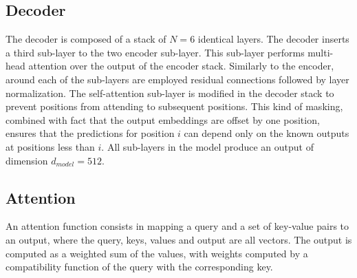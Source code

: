 \documentclass[\main/main.tex]{subfiles}
\begin{document}
\subsection{Decoder}
The decoder is composed of a stack of $N=6$ identical layers. The decoder inserts a third sub-layer to the two encoder sub-layer. This sub-layer performs multi-head attention over the output of the encoder stack. Similarly to the encoder, around each of the sub-layers are employed residual connections followed by layer normalization. The self-attention sub-layer is modified in the decoder stack to prevent positions from attending to subsequent positions. This kind of masking, combined with fact that the output embeddings are offset by one position, ensures that the predictions for position $i$ can depend only on the known outputs at positions less than $i$. All sub-layers in the model produce an output of dimension $d_{model} = 512$.

\subsection{Attention}
An attention function consists in mapping a query and a set of key-value pairs to an output, where the query, keys, values and output are all vectors. The output is computed as a weighted sum of the values, with weights computed by a compatibility function of the query with the corresponding key.
\end{document}
